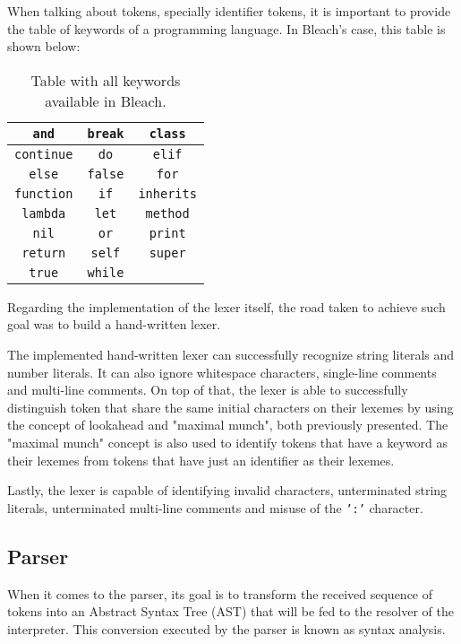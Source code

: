 When talking about tokens, specially identifier tokens, it is important to provide the table of keywords of a programming language. In Bleach's case, this table is shown below:
\begin{table}[H]
    \centering
    \begin{tabular}{|c|c|c|}
    \hline
    \texttt{and} & \texttt{break} & \texttt{class}  \\ \hline
    \texttt{continue} & \texttt{do} & \texttt{elif}  \\ \hline
    \texttt{else} & \texttt{false} & \texttt{for}  \\ \hline
    \texttt{function} & \texttt{if} & \texttt{inherits} \\ \hline
    \texttt{lambda} & \texttt{let} & \texttt{method} \\ \hline
    \texttt{nil} & \texttt{or} & \texttt{print} \\ \hline
    \texttt{return} & \texttt{self} & \texttt{super} \\ \hline
    \texttt{true} & \texttt{while} &  \\ \hline
    \end{tabular}
    \caption{Table with all keywords available in Bleach.}
\end{table}

Regarding the implementation of the lexer itself, the road taken to achieve such goal was to build a hand-written lexer.

The implemented hand-written lexer can successfully recognize string literals and number literals. It can also ignore whitespace characters, single-line comments and multi-line comments. On top of that, the lexer is able to successfully distinguish token that share the same initial characters on their lexemes by using the concept of lookahead and "maximal munch", both previously presented. The "maximal munch" concept is also used to identify tokens that have a keyword as their lexemes from tokens that have just an identifier as their lexemes. 

Lastly, the lexer is capable of identifying invalid characters, unterminated string literals, unterminated multi-line comments and misuse of the \texttt{':'} character.

\subsection{Parser}
When it comes to the parser, its goal is to transform the received sequence of tokens into an Abstract Syntax Tree (AST) that will be fed to the resolver of the interpreter. This conversion executed by the parser is known as syntax analysis.

